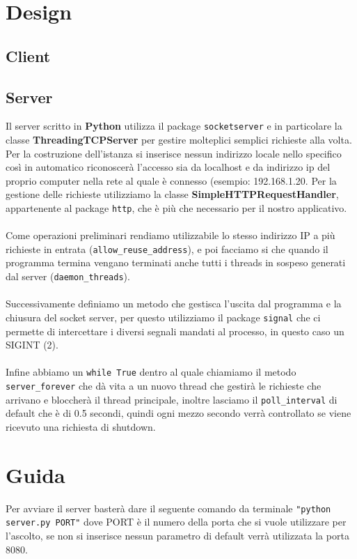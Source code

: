 \documentclass[a4paper,12pt]{report}
\begin{document}
\chapter{Design}

\section{Client}

\clearpage

\section{Server}
Il server scritto in \textbf{Python} utilizza il package \texttt{socketserver} e in particolare la classe \textbf{ThreadingTCPServer} per gestire molteplici semplici richieste alla volta.
Per la costruzione dell’istanza si inserisce nessun indirizzo locale nello specifico così in automatico riconoscerà l’accesso sia da localhost e da indirizzo ip del proprio computer nella rete al quale è connesso (esempio: 192.168.1.20.
Per la gestione delle richieste utilizziamo la classe \textbf{SimpleHTTPRequestHandler}, appartenente al package \texttt{http}, che è più che necessario per il nostro applicativo.
\\
\\
Come operazioni preliminari rendiamo utilizzabile lo stesso indirizzo IP a più richieste in entrata (\texttt{allow\_reuse\_address}), e poi facciamo si che quando il programma termina vengano terminati anche tutti i threads in sospeso generati dal server (\texttt{daemon\_threads}).
\\
\\
Successivamente definiamo un metodo che gestisca l’uscita dal programma e la chiusura del socket server, per questo utilizziamo il package \texttt{signal} che ci permette di intercettare i diversi segnali mandati al processo, in questo caso un SIGINT (2).
\\
\\
Infine abbiamo un \texttt{while True} dentro al quale chiamiamo il metodo \texttt{server\_forever} che dà vita a un nuovo thread che gestirà le richieste che arrivano e bloccherà il thread principale, inoltre lasciamo il \texttt{poll\_interval} di default che è di 0.5 secondi, quindi ogni mezzo secondo verrà controllato se viene ricevuto una richiesta di shutdown.

\chapter{Guida}
Per avviare il server basterà dare il seguente comando da terminale \texttt{"python server.py PORT"} dove PORT è il numero della porta che si vuole utilizzare per l’ascolto, se non si inserisce nessun parametro di default verrà utilizzata la porta 8080.
\end{document}
